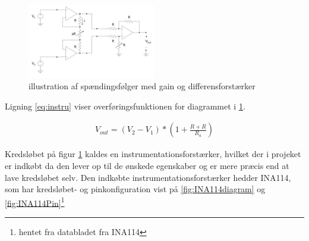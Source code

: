  \begin{figure}[H]
	\centering
	\includegraphics[width=0.5\textwidth]{billeder/Hardware/bufferampgaindifferens.JPG}
	\caption{illustration af spændingsfølger med gain og differensforstærker}
	\label{fig:bufferampmedgaindifferens}
\end{figure}

Ligning \ref{eq:instru} viser overføringsfunktionen for diagrammet i \ref{fig:bufferampmedgaindifferens}.

\begin{align}
 V_{out}=(V_{2}-V_{1})*(1+\frac{R+R}{R_{a}})
 \label{eq:instru}
 \end{align} 
 
Kredsløbet på figur \ref{fig:bufferampmedgaindifferens} kaldes en instrumentationsforstærker, hvilket der i projeket er indkøbt da den lever op til de ønskede egenskaber og er mere præcis end at lave kredsløbet selv. Den indkøbte instrumentationsforstærker hedder INA114, som har kredsløbet- og pinkonfiguration vist på \ref{fig:INA114diagram} og \ref{fig:INA114Pin}\footnote{hentet fra databladet fra INA114}
 
